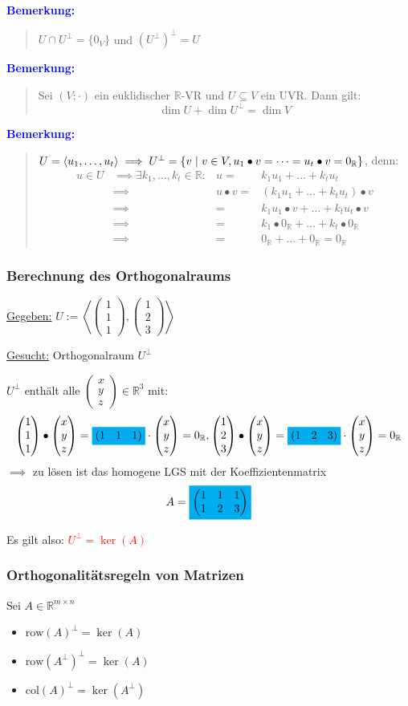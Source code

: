 \documentclass{article}
\newcommand{\smsp}{\phantom{\hspace{3px}}}
\newcommand{\red}[1]{\textcolor{red}{#1}}
\newcommand{\blue}[1]{\textcolor{blue}{#1}}
\newcommand{\hcyan}[1]{\colorbox{cyan}{#1}}
\newcommand{\an}[1]{\blue{\textbf{Bemerkung: }}\begin{quote}#1\end{quote}}
\newcommand{\R}{\mathbb{R}}
\renewcommand{\st}{\smsp | \smsp}
\newcommand{\vvvec}[3]{\begin{pmatrix}#1\\#2\\#3\end{pmatrix}}
\newcommand{\spann}[1]{\left\langle#1\right\rangle}
\newcommand{\col}{\text{col}}
\newcommand{\row}{\text{row}}
\begin{document}
\an{
    $U \cap U^{\perp} = \{0_V\}$ und $(U^{\perp})^{\perp} = U$
}

\an{
    Sei $(V; \cdot)$ ein euklidischer $\R$-VR und $U \subseteq V$ ein UVR. Dann gilt:
    \[
        \dim U + \dim U^{\perp} = \dim V
    \]
}

\newpage
\an{
    $U = \spann{u_1, \dots, u_t} \implies U^{\perp} = \{v \st v \in V, u_1 \bullet v = \dots = u_t \bullet v = 0_{\R}\}$, denn:
    \begin{align*}
        u \in U &\implies \exists k_1, \dots, k_t \in \R: &u =& k_1u_1 + \dots + k_tu_t\\
        &\implies& u \bullet v =& (k_1u_1 + \dots + k_tu_t) \bullet v\\
        &\implies&=& k_1u_1 \bullet v + \dots + k_tu_t \bullet v\\
        &\implies&=& k_1 \bullet 0_{\R} + \dots + k_t \bullet 0_{\R}\\
        &\implies&=& 0_{\R} + \dots + 0_{\R} = 0_{\R}
    \end{align*}
}

\subsubsection{Berechnung des Orthogonalraums}

\underline{Gegeben:} $U := \spann{\vvvec{1}{1}{1}, \vvvec{1}{2}{3}}$

\underline{Gesucht:} Orthogonalraum $U^{\perp}$

$U^{\perp}$ enthält alle $\vvvec{x}{y}{z} \in \R^3$ mit:
\[
    \vvvec{1}{1}{1} \bullet \vvvec{x}{y}{z} = \hcyan{(1 \; 1 \; 1)} \cdot \vvvec{x}{y}{z} = 0_{\R}, \vvvec{1}{2}{3} \bullet \vvvec{x}{y}{z} = \hcyan{(1 \; 2 \; 3)} \cdot \vvvec{x}{y}{z} = 0_{\R}
\]
$\implies$ zu lösen ist das homogene LGS mit der Koeffizientenmatrix
\[
    A = \hcyan{$\begin{pmatrix}
        1 & 1 & 1\\
        1 & 2 & 3
    \end{pmatrix}$}
\]

Es gilt also: \red{$U^{\perp} = \ker(A)$}

\subsubsection{Orthogonalitätsregeln von Matrizen}

Sei $A \in \R^{m \times n}$
\begin{itemize}
    \item ${\row(A)}^{\perp} =\ker(A)$
    \item ${\row(A^{\perp})}^{\perp} = \ker(A)$
    \item ${\col(A)}^{\perp} = \ker(A^{\perp})$
\end{itemize}
\end{document}

